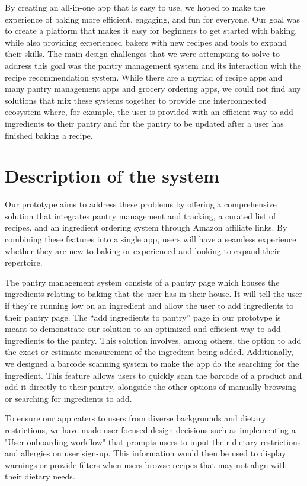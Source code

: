 \documentclass[manuscript, screen, nonacm]{acmart}
\begin{document}
By creating an all-in-one app that is easy to use, we hoped to make the experience of baking more efficient, engaging, and fun for everyone. Our goal was to create a platform that makes it easy for beginners to get started with baking, while also providing experienced bakers with new recipes and tools to expand their skills. The main design challenges that we were attempting to solve to address this goal was the pantry management system and its interaction with the recipe recommendation system. While there are a myriad of recipe apps and many pantry management apps and grocery ordering apps, we could not find any solutions that mix these systems together to provide one interconnected ecosystem where, for example, the user is provided with an efficient way to add ingredients to their pantry and for the pantry to be updated after a user has finished baking a recipe.

\section{Description of the system}
Our prototype aims to address these problems by offering a comprehensive solution that integrates pantry management and tracking, a curated list of recipes, and an ingredient ordering system through Amazon affiliate links. By combining these features into a single app, users will have a seamless experience whether they are new to baking or experienced and looking to expand their repertoire.

The pantry management system consists of a pantry page which houses the ingredients relating to baking that the user has in their house. It will tell the user if they're running low on an ingredient and allow the user to add ingredients to their pantry page. The “add ingredients to pantry” page in our prototype is meant to demonstrate our solution to an optimized and efficient way to add ingredients to the pantry. This solution involves, among others, the option to add the exact or estimate measurement of the ingredient being added. Additionally, we designed a barcode scanning system to make the app do the searching for the ingredient. This feature allows users to quickly scan the barcode of a product and add it directly to their pantry, alongside the other options of manually browsing or searching for ingredients to add.

To ensure our app caters to users from diverse backgrounds and dietary restrictions, we have made user-focused design decisions such as implementing a "User onboarding workflow" that prompts users to input their dietary restrictions and allergies on user sign-up. This information would then be used to display warnings or provide filters when users browse recipes that may not align with their dietary needs.
\end{document}
